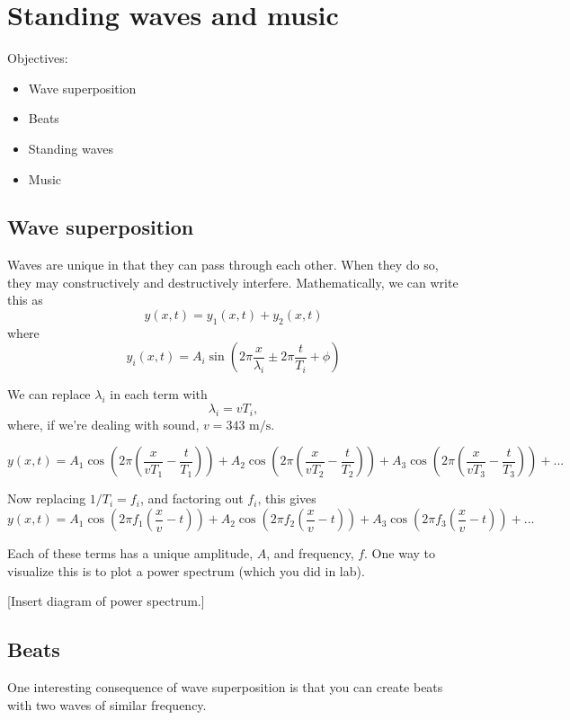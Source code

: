 \section{Standing waves and music}
Objectives:
\begin{itemize}
\item Wave superposition
\item Beats
\item Standing waves
\item Music
\end{itemize}

\hrulefill

\subsection{Wave superposition}
Waves are unique in that they can pass through each other. When they do so, they may constructively and destructively interfere. Mathematically, we can write this as
$$y(x,t)=y_1(x,t)+y_2(x,t)$$
where
$$y_i(x,t)=A_i\sin\left(2\pi\frac{x}{\lambda_i}\pm 2\pi\frac{t}{T_i}+\phi\right)$$

We can replace $\lambda_i$ in each term with
$$\lambda_i=vT_i,$$
where, if we're dealing with sound, $v=343\mbox{ m/s}$.

$$y(x,t)=A_1\cos\left(2\pi\left(\frac{x}{vT_1}-\frac{t}{T_1}\right)\right) + A_2\cos\left(2\pi\left(\frac{x}{vT_2}-\frac{t}{T_2}\right)\right) + A_3\cos\left(2\pi\left(\frac{x}{vT_3}-\frac{t}{T_3}\right)\right)+...$$

Now replacing $1/T_i=f_i$, and factoring out $f_i$, this gives
$$y(x,t)=A_1\cos\left(2\pi f_1\left(\frac{x}{v}-t\right)\right) + A_2\cos\left(2\pi f_2\left(\frac{x}{v}-t\right)\right) + A_3\cos\left(2\pi f_3\left(\frac{x}{v}-t\right)\right)+...$$

Each of these terms has a unique amplitude, $A$, and frequency, $f$. One way to visualize this is to plot a power spectrum (which you did in lab).

[Insert diagram of power spectrum.]
\vspace{5cm}

\vspace{5cm}


\subsection{Beats}
One interesting consequence of wave superposition is that you can create beats with two waves of similar frequency.

